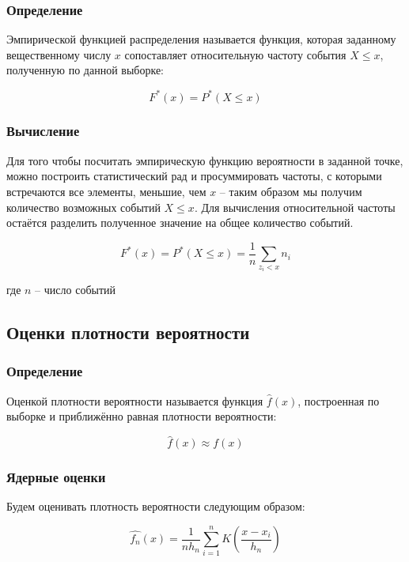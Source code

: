 \subsubsection{Определение}
Эмпирической функцией распределения называется функция, которая заданному вещественному числу $x$ сопоставляет относительную частоту события $X \leq x$, полученную по данной выборке:

\begin{equation}\label{edf}
F^*(x)=P^*(X \leq x)
\end{equation}

\subsubsection{Вычисление}
Для того чтобы посчитать эмпирическую функцию вероятности в заданной точке, можно построить статистический рад и просуммировать частоты, с которыми встречаются все элементы, меньшие, чем $x$  -- таким образом мы получим количество возможных событий $X \leq x $. Для вычисления относительной частоты остаётся разделить полученное значение на общее количество событий.

\begin{equation}\label{edf}
F^*(x)=P^*(X \leq x) = \displaystyle \frac{1}{n}\sum_{z_i < x}{n_i}
\end{equation}

где $n$ -- число событий

\subsection{Оценки плотности вероятности}
\subsubsection{Определение}

Оценкой плотности вероятности называется функция $\hat{f}(x)$, построенная по выборке и приближённо равная плотности вероятности:

\begin{equation}
\hat{f}(x) \approx f(x)
\end{equation}

\subsubsection{Ядерные оценки}

Будем оценивать плотность вероятности следующим образом:

\begin{equation}
\hat{f_n}(x) = \displaystyle \frac{1}{nh_n}\sum_{i=1}^{n}{K\left(\frac{x - x_i}{h_n}\right)}
\end{equation}

